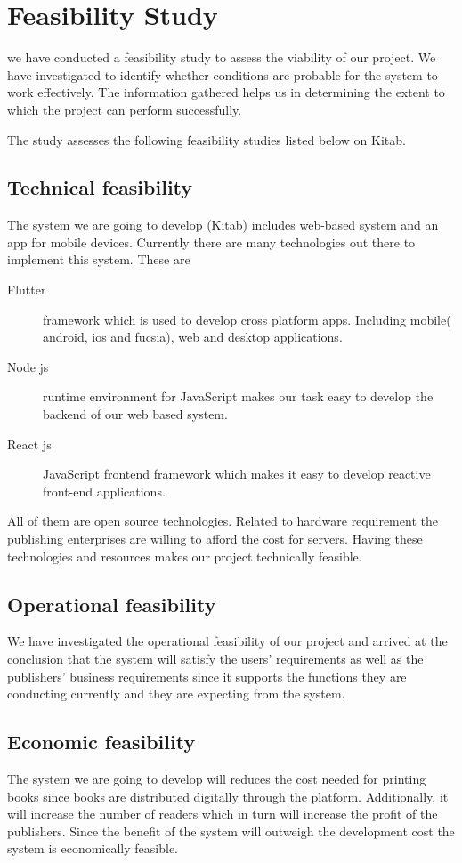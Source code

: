 \section{Feasibility Study}
we have conducted a feasibility study to assess the viability of our project. We have investigated to identify whether conditions are probable for the system to work effectively. The information gathered helps us in determining the extent to which the project can perform successfully.

\bigskip

The study assesses the following feasibility studies listed below on Kitab.

	\subsection{Technical feasibility}
The system we are going to develop (Kitab) includes web-based system and an app for mobile devices. Currently there are many technologies out there to implement this system.
These are

	\begin{description}
	\item[Flutter] framework which is used to develop cross platform apps. Including mobile( android, ios and fucsia), web and desktop applications.
	\item[Node js] runtime environment  for JavaScript makes our task easy to develop the backend of our web based system.
	\item[React js] JavaScript frontend framework which makes it easy to develop reactive front-end applications.
	\end{description}

All of them are open source technologies. Related to hardware requirement the publishing enterprises are willing to afford the cost for servers. Having these technologies and resources makes our project technically feasible.

	\subsection{Operational feasibility}
We have investigated the operational feasibility of our project and arrived at the conclusion that the system will satisfy the users’ requirements as well as the publishers’ business requirements since it supports the functions they are conducting currently and they are expecting from the system.

	\subsection{Economic feasibility}
The system we are going to develop will reduces the cost needed for printing books since books are distributed digitally through the platform. Additionally, it will increase the number of readers which in turn will increase the profit of the publishers. Since the benefit of the system will outweigh the development cost the system is economically feasible.

